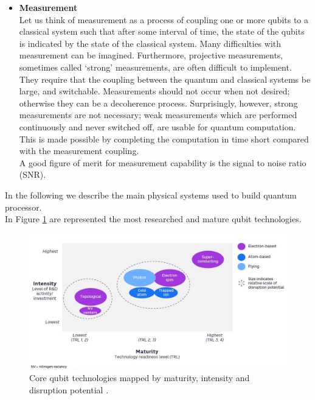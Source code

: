 \begin{itemize}
    \item \textbf{Measurement} \\
    Let us think of measurement as a process of coupling one or more qubits to a classical system such that after some interval of time, the state of the qubits is indicated by the state of the classical system. Many difficulties with measurement can be imagined. Furthermore, projective measurements, sometimes called ‘strong’ measurements, are often difficult to implement. They require that the coupling between the quantum and classical systems be large, and switchable. Measurements should not occur when not desired; otherwise they can be a decoherence process. Surprisingly, however, strong measurements are not necessary; weak measurements which are performed continuously and never switched off, are usable for quantum computation. This is made possible by completing the computation in time short compared with the measurement coupling. \\
    A good figure of merit for measurement capability is the signal to noise ratio (SNR).
\end{itemize}
In the following we describe the main physical systems used to build quantum processor. \\
In Figure \ref{Core qubit technologies} are represented the most researched and mature qubit technologies.
\begin{figure}[ht]
  \centering
  \includegraphics[width=\textwidth]{figures/Core qubit technologies.jpg}
  \caption{Core qubit technologies mapped by maturity, intensity and disruption potential \cite{BibEntry2022May}.} \label{Core qubit technologies}
\end{figure}

